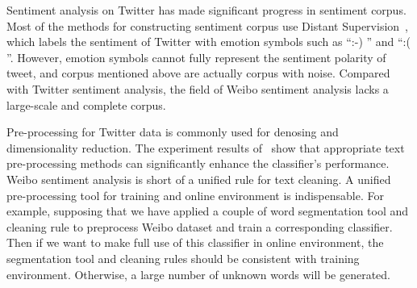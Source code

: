 \documentclass[runningheads]{llncs}
\begin{document}
Sentiment analysis on Twitter has made significant progress in sentiment corpus. Most of the methods for constructing sentiment corpus use Distant Supervision~\cite{go2009twitter}, which labels the sentiment of Twitter with emotion symbols such as ``:-) '' and ``:( ''. However, emotion symbols cannot fully represent the sentiment polarity of tweet, and corpus mentioned above are actually corpus with noise. Compared with Twitter sentiment analysis, the field of Weibo sentiment analysis lacks a large-scale and complete corpus.

Pre-processing for Twitter data is commonly used for denosing and dimensionality reduction. The experiment results of~\cite{haddi2013role} show that appropriate text pre-processing methods can significantly enhance the classifier's performance. Weibo sentiment analysis is short of a unified rule for text cleaning. A unified pre-processing tool for training and online environment is indispensable. For example, supposing that we have applied a couple of word segmentation tool and cleaning rule to preprocess Weibo dataset and train a corresponding classifier. Then if we want to make full use of this classifier in online environment, the segmentation tool and cleaning rules should be consistent with training environment. Otherwise, a large number of unknown words will be generated.
\end{document}
